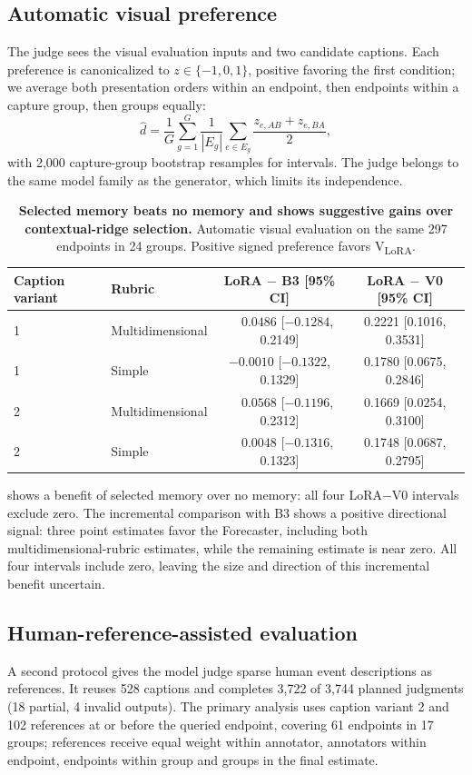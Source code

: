 \documentclass[10pt]{article}
\begin{document}
\subsection{Automatic visual preference}
The judge sees the visual evaluation inputs and two candidate captions. Each preference is canonicalized to $z\in\{-1,0,1\}$, positive favoring the first condition; we average both presentation orders within an endpoint, then endpoints within a capture group, then groups equally:
\begin{equation}
\hat d = \frac{1}{G}\sum_{g=1}^{G}\frac{1}{|E_g|}\sum_{e\in E_g}\frac{z_{e,AB}+z_{e,BA}}{2},
\end{equation}
with 2,000 capture-group bootstrap resamples for intervals. The judge belongs to the same model family as the generator, which limits its independence.

\begin{table}[t]
\centering
\caption{\textbf{Selected memory beats no memory and shows suggestive gains over contextual-ridge selection.} Automatic visual evaluation on the same 297 endpoints in 24 groups. Positive signed preference favors V\textsubscript{LoRA}.}
\label{tab:caption}
\begin{tabular}{llcc}
\toprule
Caption variant & Rubric & LoRA $-$ B3 [95\% CI] & LoRA $-$ V0 [95\% CI] \\
\midrule
1 & Multidimensional & $\phantom{-}0.0486$ [$-0.1284$, 0.2149] & 0.2221 [0.1016, 0.3531] \\
1 & Simple & $-0.0010$ [$-0.1322$, 0.1329] & 0.1780 [0.0675, 0.2846] \\
2 & Multidimensional & $\phantom{-}0.0568$ [$-0.1196$, 0.2312] & 0.1669 [0.0254, 0.3100] \\
2 & Simple & $\phantom{-}0.0048$ [$-0.1316$, 0.1323] & 0.1748 [0.0687, 0.2795] \\
\bottomrule
\end{tabular}
\end{table}

 shows a benefit of selected memory over no memory: all four LoRA$-$V0 intervals exclude zero. The incremental comparison with B3 shows a positive directional signal: three point estimates favor the Forecaster, including both multidimensional-rubric estimates, while the remaining estimate is near zero. All four intervals include zero, leaving the size and direction of this incremental benefit uncertain.

\subsection{Human-reference-assisted evaluation}
A second protocol gives the model judge sparse human event descriptions as references. It reuses 528 captions and completes 3,722 of 3,744 planned judgments (18 partial, 4 invalid outputs). The primary analysis uses caption variant 2 and 102 references at or before the queried endpoint, covering 61 endpoints in 17 groups; references receive equal weight within annotator, annotators within endpoint, endpoints within group and groups in the final estimate.
\end{document}
